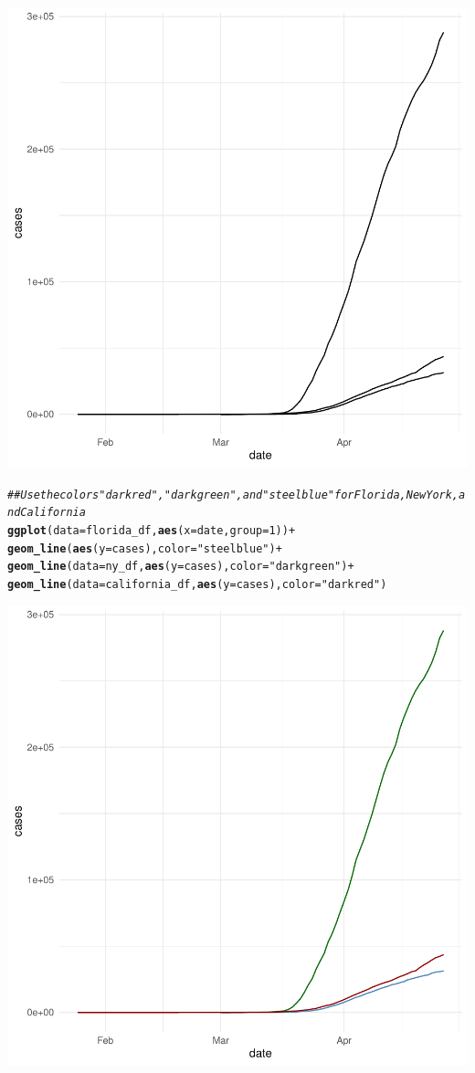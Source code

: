 \documentclass{article}\usepackage[]{graphicx}\usepackage[]{xcolor}
\makeatletter
\newcommand{\hlnum}[1]{\textcolor[rgb]{0.686,0.059,0.569}{#1}}%
\newcommand{\hlstr}[1]{\textcolor[rgb]{0.192,0.494,0.8}{#1}}%
\newcommand{\hlcom}[1]{\textcolor[rgb]{0.678,0.584,0.686}{\textit{#1}}}%
\newcommand{\hlopt}[1]{\textcolor[rgb]{0,0,0}{#1}}%
\newcommand{\hlstd}[1]{\textcolor[rgb]{0.345,0.345,0.345}{#1}}%
\newcommand{\hlkwc}[1]{\textcolor[rgb]{0.333,0.667,0.333}{#1}}%
\newcommand{\hlkwd}[1]{\textcolor[rgb]{0.737,0.353,0.396}{\textbf{#1}}}%
\newenvironment{kframe}{%
 \def\at@end@of@kframe{}%
 \ifinner\ifhmode%
  \def\at@end@of@kframe{\end{minipage}}%
  \begin{minipage}{\columnwidth}%
 \fi\fi%
 \def\FrameCommand##1{\hskip\@totalleftmargin \hskip-\fboxsep
 \colorbox{shadecolor}{##1}\hskip-\fboxsep
     \hskip-\linewidth \hskip-\@totalleftmargin \hskip\columnwidth}%
 \MakeFramed {\advance\hsize-\width
   \@totalleftmargin\z@ \linewidth\hsize
   \@setminipage}}%
 {\par\unskip\endMakeFramed%
 \at@end@of@kframe}
\newenvironment{knitrout}{}{} %
\makeatother
\begin{document}
\begin{knitrout}
{\centering \includegraphics[width=.6\linewidth]{figure/assignment-06-ReppetoBrian-Rnwauto-report-7} 

}


\begin{kframe}\begin{alltt}
\hlcom{## Use the colors "darkred", "darkgreen", and "steelblue" for Florida, New York, and California}
\hlkwd{ggplot}\hlstd{(}\hlkwc{data}\hlstd{=florida_df,} \hlkwd{aes}\hlstd{(}\hlkwc{x}\hlstd{=date,} \hlkwc{group}\hlstd{=}\hlnum{1}\hlstd{))} \hlopt{+}
  \hlkwd{geom_line}\hlstd{(}\hlkwd{aes}\hlstd{(}\hlkwc{y} \hlstd{= cases),} \hlkwc{color} \hlstd{=} \hlstr{"steelblue"}\hlstd{)} \hlopt{+}
  \hlkwd{geom_line}\hlstd{(}\hlkwc{data}\hlstd{=ny_df,} \hlkwd{aes}\hlstd{(}\hlkwc{y} \hlstd{= cases),} \hlkwc{color}\hlstd{=} \hlstr{"darkgreen"}\hlstd{)} \hlopt{+}
  \hlkwd{geom_line}\hlstd{(}\hlkwc{data}\hlstd{=california_df,} \hlkwd{aes}\hlstd{(}\hlkwc{y} \hlstd{= cases),} \hlkwc{color}\hlstd{=}\hlstr{"darkred"}\hlstd{)}
\end{alltt}
\end{kframe}

{\centering \includegraphics[width=.6\linewidth]{figure/assignment-06-ReppetoBrian-Rnwauto-report-8} 

}
\end{knitrout}
\end{document}

